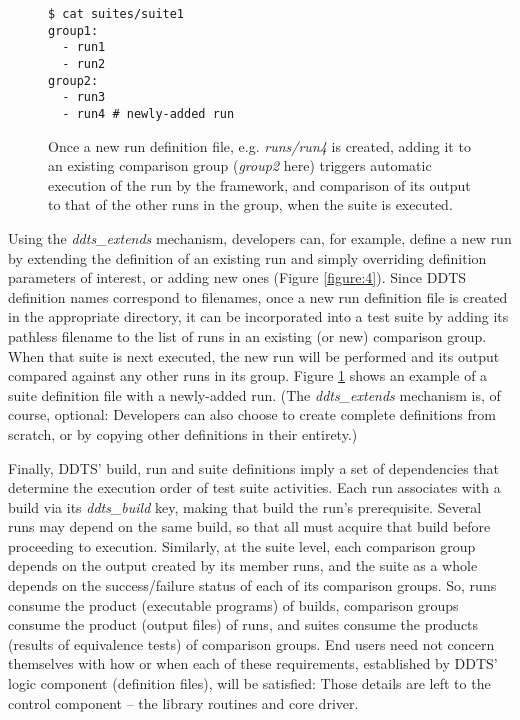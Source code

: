 \documentclass[conference]{IEEEtran}
\begin{document}
\begin{figure}[!t]
{\small \begin{verbatim}
$ cat suites/suite1
group1:
  - run1
  - run2
group2:
  - run3
  - run4 # newly-added run
\end{verbatim} }
\caption{Once a new run definition file, e.g. \emph{runs/run4} is created, adding it to an existing comparison group (\emph{group2} here) triggers automatic execution of the run by the framework, and comparison of its output to that of the other runs in the group, when the suite is executed.}
\label{figure:5}
\end{figure}

Using the \emph{ddts\_extends} mechanism, developers can, for example, define a new run by extending the definition of an existing run and simply overriding definition parameters of interest, or adding new ones (Figure \ref{figure:4}). Since DDTS definition names correspond to filenames, once a new run definition file is created in the appropriate directory, it can be incorporated into a test suite by adding its pathless filename to the list of runs in an existing (or new) comparison group. When that suite is next executed, the new run will be performed and its output compared against any other runs in its group. Figure \ref{figure:5} shows an example of a suite definition file with a newly-added run. (The \emph{ddts\_extends} mechanism is, of course, optional: Developers can also choose to create complete definitions from scratch, or by copying other definitions in their entirety.)

Finally, DDTS' build, run and suite definitions imply a set of dependencies that determine the execution order of test suite activities. Each run associates with a build via its \emph{ddts\_build} key, making that build the run's prerequisite. Several runs may depend on the same build, so that all must acquire that build before proceeding to execution. Similarly, at the suite level, each comparison group depends on the output created by its member runs, and the suite as a whole depends on the success/failure status of each of its comparison groups. So, runs consume the product (executable programs) of builds, comparison groups consume the product (output files) of runs, and suites consume the products (results of equivalence tests) of comparison groups. End users need not concern themselves with how or when each of these requirements, established by DDTS' logic component (definition files), will be satisfied: Those details are left to the control component -- the library routines and core driver.
\end{document}
